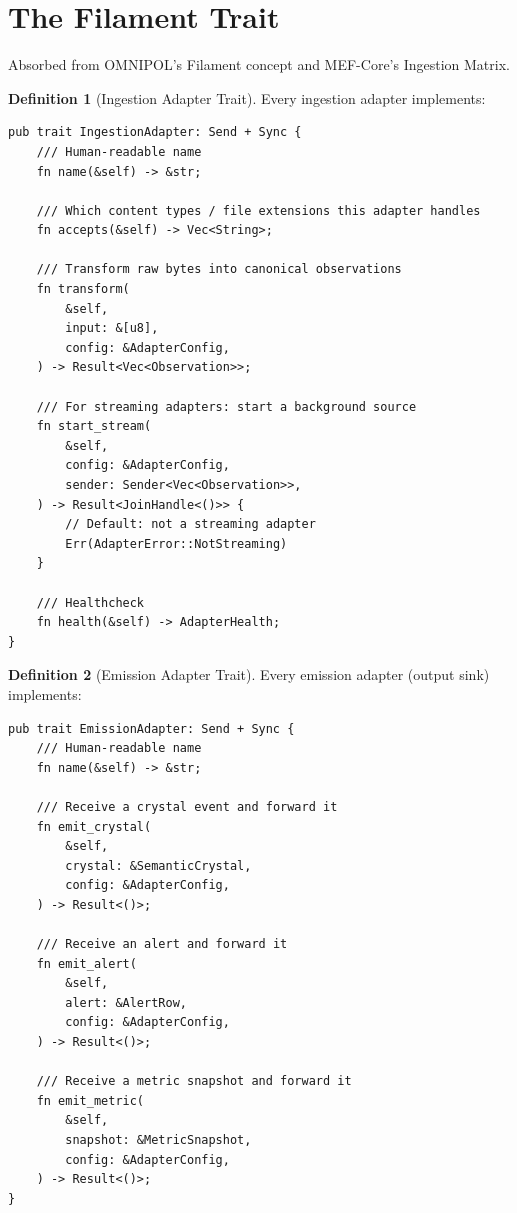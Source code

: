 \documentclass[11pt,a4paper,twoside]{article}
\theoremstyle{definition}
\newtheorem{definition}{Definition}[section]
\theoremstyle{plain}
\theoremstyle{remark}
\begin{document}
\section{The Filament Trait}\label{sec:ad:filament}

Absorbed from OMNIPOL's Filament concept and MEF-Core's Ingestion
Matrix.

\begin{definition}[Ingestion Adapter Trait]\label{def:ingesttrait}
Every ingestion adapter implements:
\begin{lstlisting}
pub trait IngestionAdapter: Send + Sync {
    /// Human-readable name
    fn name(&self) -> &str;

    /// Which content types / file extensions this adapter handles
    fn accepts(&self) -> Vec<String>;

    /// Transform raw bytes into canonical observations
    fn transform(
        &self,
        input: &[u8],
        config: &AdapterConfig,
    ) -> Result<Vec<Observation>>;

    /// For streaming adapters: start a background source
    fn start_stream(
        &self,
        config: &AdapterConfig,
        sender: Sender<Vec<Observation>>,
    ) -> Result<JoinHandle<()>> {
        // Default: not a streaming adapter
        Err(AdapterError::NotStreaming)
    }

    /// Healthcheck
    fn health(&self) -> AdapterHealth;
}
\end{lstlisting}
\end{definition}

\begin{definition}[Emission Adapter Trait]\label{def:emittrait}
Every emission adapter (output sink) implements:
\begin{lstlisting}
pub trait EmissionAdapter: Send + Sync {
    /// Human-readable name
    fn name(&self) -> &str;

    /// Receive a crystal event and forward it
    fn emit_crystal(
        &self,
        crystal: &SemanticCrystal,
        config: &AdapterConfig,
    ) -> Result<()>;

    /// Receive an alert and forward it
    fn emit_alert(
        &self,
        alert: &AlertRow,
        config: &AdapterConfig,
    ) -> Result<()>;

    /// Receive a metric snapshot and forward it
    fn emit_metric(
        &self,
        snapshot: &MetricSnapshot,
        config: &AdapterConfig,
    ) -> Result<()>;
}
\end{lstlisting}
\end{definition}
\end{document}
